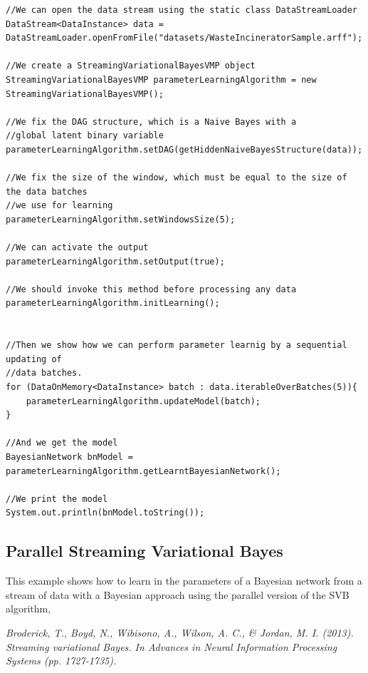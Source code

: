 \begin{lstlisting}
//We can open the data stream using the static class DataStreamLoader
DataStream<DataInstance> data = DataStreamLoader.openFromFile("datasets/WasteIncineratorSample.arff");

//We create a StreamingVariationalBayesVMP object
StreamingVariationalBayesVMP parameterLearningAlgorithm = new StreamingVariationalBayesVMP();

//We fix the DAG structure, which is a Naive Bayes with a 
//global latent binary variable
parameterLearningAlgorithm.setDAG(getHiddenNaiveBayesStructure(data));

//We fix the size of the window, which must be equal to the size of the data batches 
//we use for learning
parameterLearningAlgorithm.setWindowsSize(5);

//We can activate the output
parameterLearningAlgorithm.setOutput(true);

//We should invoke this method before processing any data
parameterLearningAlgorithm.initLearning();


//Then we show how we can perform parameter learnig by a sequential updating of 
//data batches.
for (DataOnMemory<DataInstance> batch : data.iterableOverBatches(5)){
    parameterLearningAlgorithm.updateModel(batch);
}

//And we get the model
BayesianNetwork bnModel = parameterLearningAlgorithm.getLearntBayesianNetwork();

//We print the model
System.out.println(bnModel.toString());
\end{lstlisting}


\subsection{Parallel Streaming Variational Bayes}

This example shows how to learn in the parameters of a Bayesian network from a stream of data with a Bayesian
approach using the parallel version  of the SVB algorithm, 

\textit{Broderick, T., Boyd, N., Wibisono, A., Wilson, A. C., \& Jordan, M. I. (2013). Streaming variational Bayes. 
In Advances in Neural Information Processing Systems (pp. 1727-1735).
}


